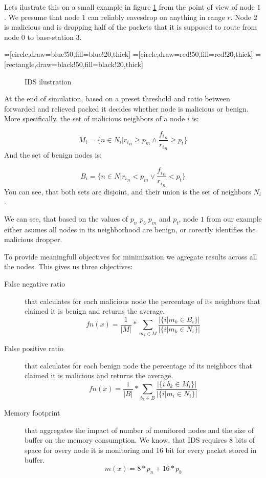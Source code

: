 \documentclass[12pt,oneside]{fithesis2}
\begin{document}
Lets ilustrate this on a small example in figure \ref{boinc2} from the point of view of node $1$.
We presume that node $1$ can reliably eavesdrop on anything in range $r$. Node $2$ is malicious and is dropping half of the packets that it is supposed to route from node $0$ to base-station $3$.

=[circle,draw=blue!50,fill=blue!20,thick]
=[circle,draw=red!50,fill=red!20,thick]
=[rectangle,draw=black!50,fill=black!20,thick]
\begin{figure}[htb!]
\caption{IDS ilustration}
\label{boinc2}
\centering
{}
\end{figure}

At the end of simulation, based on a preset threshold and ratio between forwarded and relieved packed it decides whether node is malicious or benign. More specifically, the set of malicious neighbors of a node $i$ is:

$$ M_i = \{n \in N_i|{r_i}_n \geq p_m \land \frac{{f_i}_n}{{r_i}_n} \geq p_t \} $$
And the set of benign nodes is:

$$B_i = \{n \in N|{r_i}_n < p_m \lor \frac{{f_i}_n}{{r_i}_n} < p_t \} $$
You can see, that both sets are disjoint, and their union is the set of neighbors $N_i$. 

We can see, that based on the values of $p_n$ $p_b$ $p_m$ and $p_t$, node $1$ from our example either asumes all nodes in its neighborhood are benign, or corectly identifies the malicious dropper.

To provide meaningfull objectives for minimization we agregate results across all the nodes. This gives us three objectives:
\begin{description}
\item[False negative ratio] that calculates for each malicious node the percentage of its neighbors that claimed it is benign and returns the average.
$$fn(x) = \frac{1}{|M|}* \sum\limits_{m_k\in M} \frac{|\{i|m_k \in B_i\}|}{|\{i|m_k \in N_i\}|} $$
\item[False positive ratio] that calculates for each benign node the percentage of its neighbors that claimed it is malicious and returns the average.
$$fn(x) = \frac{1}{|B|}* \sum\limits_{b_k\in B} \frac{|\{i|b_k \in M_i\}|}{|\{i|m_i \in N_i\}|} $$
\item[Memory footprint] that aggregates the impact of number of monitored nodes and the size of buffer on the memory consumption. We know, that IDS requires 8 bits of space for overy node it is monitoring and 16 bit for every packet stored in buffer.
$$m(x) = 8*p_n + 16*p_b $$
\end{description}
\end{document}
